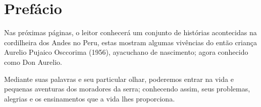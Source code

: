 \cleardoublepage
\newpage
\thispagestyle{empty}
\vfill


\chapter*{Prefácio} %

Nas próximas páginas, o leitor conhecerá um conjunto de histórias acontecidas na cordilheira dos Andes no Peru, estas mostram algumas vivências do então criança Aurelio Pujaico Osccorima (1956), %
ayacuchano de nascimento;
agora conhecido como Don Aurelio.

Mediante suas palavras e seu particular olhar, poderemos entrar na vida e pequenas aventuras dos moradores da serra; conhecendo assim, seus problemas, alegrias e os ensinamentos que a vida lhes proporciona. 
\vfill

\newpage
\thispagestyle{empty}
